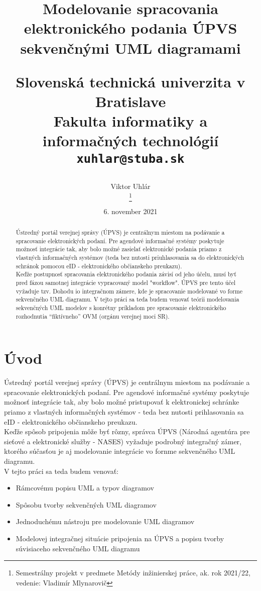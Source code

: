 \documentclass[10pt,twoside,slovak,a4paper]{article}
\title{{\bf Modelovanie spracovania elektronického podania ÚPVS sekvenčnými UML diagramami}

\author{Viktor Uhlár\\[2pt]
\thanks{Semestrálny projekt v predmete Metódy inžinierskej práce, ak. rok 2021/22, vedenie: Vladimír Mlynarovič}} %
	{\small Slovenská technická univerzita v Bratislave}\\
	{\small Fakulta informatiky a informačných technológií}\\
	{\small \texttt{xuhlar@stuba.sk}}
	}
\date{\small 6. november 2021} %
\begin{document}
\begin {titlepage}
\centering
\maketitle

\begin{abstract}


{Ústredný portál verejnej správy (ÚPVS) je centrálnym miestom na podávanie a spracovanie elektronických podaní. Pre agendové informačné systémy poskytuje možnosť integrácie tak, aby bolo možné zasielať elektronické podania priamo z vlastných informačných systémov (teda bez nutosti priuhlasovania sa do elektronických schránok pomocou eID - elektronického občianskeho preukazu).}\\
{Keďže postupnosť spracovania elektronického podania závisí od jeho účelu, musí byť pred fázou samotnej integrácie vypracovaný model "workflow". ÚPVS pre tento účel vyžaduje tzv. Dohodu io integračnom zámere, kde je spracovanie modelované vo forme sekvenčného UML diagramu.
V tejto práci sa teda budem venovať teórii modelovania sekvenčných UML modelov s konrétny príkladom pre spracovanie elektronického rozhodnutia ``fiktívneho''  OVM (orgánu verejnej moci SR).}

\end{abstract}

\end{titlepage}
\flushleft
\section{Úvod}

Ústredný portál verejnej správy (ÚPVS) je centrálnym miestom na podávanie a spracovanie elektronických podaní. Pre agendové informačné systémy poskytuje možnosť integrácie tak, aby bolo možné pristupovať k elektronickej schránke priamo z vlastných informačných systémov - teda bez nutosti prihlasovania sa eID - elektronického občianskeho preukazu.\\

Keďže spôsob pripojenia môže byť rôzny, správca ÚPVS (Národná agentúra pre sieťové a elektronické služby - NASES) vyžaduje podrobný integračný zámer, ktorého súčasťou je aj modelovanie integrácie vo fornme sekvenčného UML diagramu.\\ 

V tejto práci sa teda budem venovať:

\begin{itemize}
\item Rámcovému popisu UML a typov diagramov
\item Spôsobu tvorby sekvenčných UML diagramov
\item Jednoduchému nástroju pre modelovanie UML diagramov
\item Modelovej integračnej situácie pripojenia na ÚPVS a popisu tvorby súvisiaceho sekvenčného UML diagramu
\end{itemize}
\end{document}
